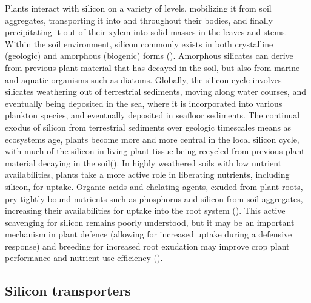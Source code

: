 \documentclass[12pt, letterpaper, ]{article}
\begin{document}
Plants interact with silicon on a variety of levels, mobilizing it from soil aggregates, transporting it into and throughout their bodies, and finally precipitating it out of their xylem into solid masses in the leaves and stems. Within the soil environment, silicon commonly exists in both crystalline (geologic) and amorphous (biogenic) forms (\cite{haynes_contemporary_2014}). Amorphous silicates can derive from previous plant material that has decayed in the soil, but also from marine and aquatic organisms such as diatoms. Globally, the silicon cycle involves silicates weathering out of terrestrial sediments, moving along water courses, and eventually being deposited in the sea, where it is incorporated into various plankton species, and eventually deposited in seafloor sediments. The continual exodus of silicon from terrestrial sediments over geologic timescales means as ecosystems age, plants become more and more central in the local silicon cycle, with much of the silicon in living plant tissue being recycled from previous plant material decaying in the soil(\cite{de_tombeur_plants_2020}). In highly weathered soils with low nutrient availabilities, plants take a more active role in liberating nutrients, including silicon, for uptake. Organic acids and chelating agents, exuded from plant roots, pry tightly bound nutrients such as phosphorus and silicon from soil aggregates, increasing their availabilities for uptake into the root system (\cite{de_tombeur_silicon_2021-1}). This active scavenging for silicon remains poorly understood, but it may be an important mechanism in plant defence (allowing for increased uptake during a defensive response) and breeding for increased root exudation may improve crop plant performance and nutrient use efficiency (\cite{de_tombeur_silicon_2021}).

\subsection{Silicon transporters}	
\end{document}

